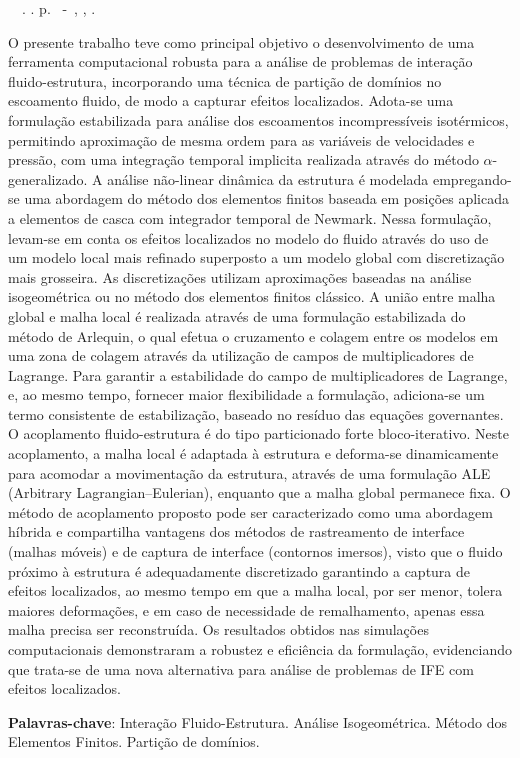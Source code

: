 \setlength{\absparsep}{18pt} %
\begin{resumo}
	\begin{flushleft} 
			\setlength{\absparsep}{0pt} %
			\SingleSpacing 
			\imprimirautorabr~~\textbf{\imprimirtituloresumo}.	\imprimirdata. \pageref{LastPage} p. 
			\imprimirtipotrabalho~-~\imprimirinstituicao, \imprimirlocal, \imprimirdata. 
 	\end{flushleft}
\OnehalfSpacing 			
	O presente trabalho teve como principal objetivo o desenvolvimento de uma ferramenta computacional robusta para a análise de problemas de interação fluido-estrutura, incorporando uma técnica de partição de domínios no escoamento fluido, de modo a capturar efeitos localizados.
Adota-se uma formulação estabilizada para análise dos escoamentos incompressíveis isotérmicos, permitindo aproximação de mesma ordem para as variáveis de velocidades e pressão, com uma integração temporal implicita realizada através do método $\alpha$-generalizado. A análise não-linear dinâmica da estrutura é modelada empregando-se uma abordagem do método dos elementos finitos baseada em posições aplicada a elementos de casca com integrador temporal de Newmark.
Nessa formulação, levam-se em conta os efeitos localizados no modelo do fluido através do uso de um modelo local mais refinado superposto a um modelo global com discretização mais grosseira. As discretizações utilizam aproximações baseadas na análise isogeométrica ou no método dos elementos finitos clássico. A união entre malha global e malha local é realizada através de uma formulação estabilizada do método de Arlequin, o qual efetua o cruzamento e colagem entre os modelos em uma zona de colagem através da utilização de campos de multiplicadores de Lagrange. Para garantir a estabilidade do campo de multiplicadores de Lagrange, e, ao mesmo tempo, fornecer maior flexibilidade a formulação, adiciona-se um termo consistente de estabilização, baseado no resíduo das equações governantes.
O acoplamento fluido-estrutura é do tipo particionado forte bloco-iterativo. Neste acoplamento, a malha local é adaptada à estrutura e deforma-se dinamicamente para acomodar a movimentação da estrutura, através de uma formulação ALE (Arbitrary Lagrangian–Eulerian), enquanto que a malha global permanece fixa. O  método de acoplamento proposto pode ser caracterizado como uma abordagem híbrida e  compartilha vantagens dos métodos de rastreamento de interface (malhas móveis) e de captura de interface (contornos imersos), visto que o fluido próximo à estrutura é adequadamente discretizado garantindo a captura de efeitos localizados, ao mesmo tempo em que a malha local, por ser menor, tolera maiores deformações, e em caso de necessidade de remalhamento, apenas essa malha precisa ser reconstruída. 
Os resultados obtidos nas simulações computacionais demonstraram a robustez e eficiência da formulação, evidenciando que trata-se de uma nova alternativa para análise de problemas de IFE com efeitos localizados.

 \textbf{Palavras-chave}: Interação Fluido-Estrutura.  Análise Isogeométrica. Método dos Elementos Finitos. Partição de domínios.
\end{resumo}